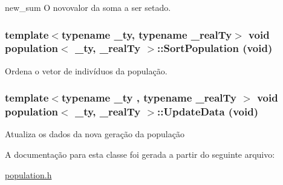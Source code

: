 new\_\-sum O novovalor da soma a ser setado. \hypertarget{classpopulation_a83be39057000008244d4d7bc947d09fa}{
\subsubsection[{SortPopulation}]{\setlength{\rightskip}{0pt plus 5cm}template$<$typename \_\-ty, typename \_\-realTy$>$ void {\bf population}$<$ \_\-ty, \_\-realTy $>$::SortPopulation (void)}}
\label{classpopulation_a83be39057000008244d4d7bc947d09fa}
Ordena o vetor de indivíduos da população. \hypertarget{classpopulation_a7dd1a669bdbc71381ad2d01ca35c24ae}{
\subsubsection[{UpdateData}]{\setlength{\rightskip}{0pt plus 5cm}template$<$typename \_\-ty , typename \_\-realTy $>$ void {\bf population}$<$ \_\-ty, \_\-realTy $>$::UpdateData (void)}}
\label{classpopulation_a7dd1a669bdbc71381ad2d01ca35c24ae}
Atualiza os dados da nova geração da população 

A documentação para esta classe foi gerada a partir do seguinte arquivo:\begin{DoxyCompactItemize}
\item 
\hyperlink{population_8h}{population.h}\end{DoxyCompactItemize}
